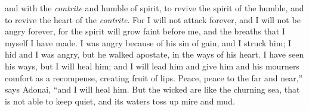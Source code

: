 \begin{biblechapter}
and with the \textit{contrite} and humble of spirit, 
to revive the spirit of the humble, 
and to revive the heart of the \textit{contrite}.
\verse For I will not attack forever, 
and I will not be angry forever, 
for the spirit will grow faint before me, 
and the breaths that I myself I have made.
\verse I was angry because of his sin of gain, and I struck him; 
I hid and I was angry, but he walked apostate, in the ways of his heart.
\verse I have seen his ways, but I will heal him; 
and I will lead him and give him and his mourners comfort as a recompense,
\verse creating fruit of lips. 
Peace, peace to the far and near,” says Adonai, “and I will heal him.
\verse But the wicked are like the churning sea, 
that is not able to keep quiet, 
and its waters toss up mire and mud.
\end{biblechapter}


